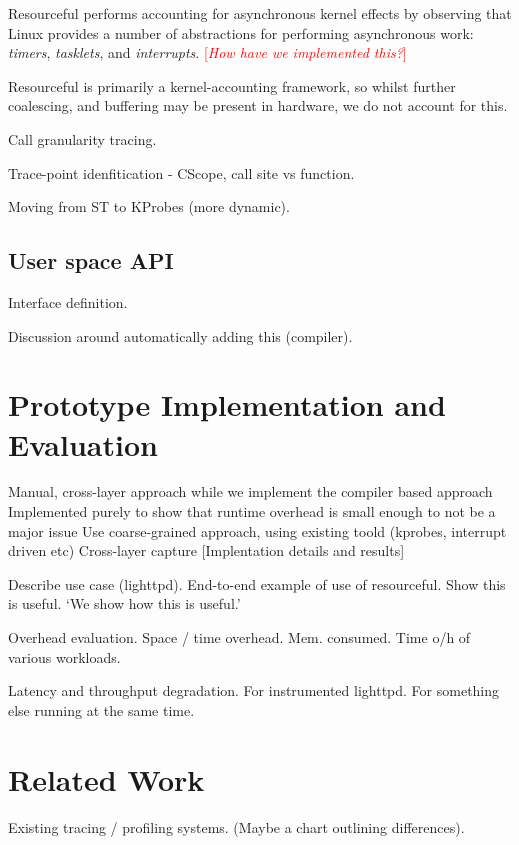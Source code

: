 \documentclass[letterpaper,twocolumn,10pt]{article}
\newcommand{\pname}{Resourceful}
\newcommand{\lnote}[1]{\textcolor{red}{[\textit{#1}]}} %
\begin{document}
\pname{ } performs accounting for asynchronous kernel effects by observing that Linux provides a number of abstractions for performing asynchronous work: \emph{timers}, \emph{tasklets}, and \emph{interrupts}.
\lnote{How have we implemented this?}

\pname{ } is primarily a kernel-accounting framework, so whilst further coalescing, and buffering may be present in hardware, we do not account for this.


Call granularity tracing.

Trace-point idenfitication - CScope, call site vs function.

Moving from ST to KProbes (more dynamic).

\subsection{User space API}
Interface definition.

Discussion around automatically adding this (compiler).	

\section{Prototype Implementation and Evaluation}
Manual, cross-layer approach while we implement the compiler based approach
Implemented purely to show that runtime overhead is small enough to not be a major issue
Use coarse-grained approach, using existing toold (kprobes, interrupt driven etc)
Cross-layer capture
[Implentation details and results]

Describe use case (lighttpd).\newline
End-to-end example of use of resourceful. Show this is useful. `We show how this
is useful.'

Overhead evaluation.\newline
Space / time overhead. Mem. consumed. Time o/h of various workloads.

Latency and throughput degradation.\newline
For instrumented lighttpd. For something else running at the same time.


\section{Related Work}
Existing tracing / profiling systems. (Maybe a chart outlining differences).
\end{document}

